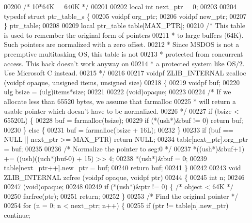 \begin{DoxyCode}
{00200 \textcolor{comment}{/* 10*64K = 640K */}
00201 
00202 local \textcolor{keywordtype}{int} next\_ptr = 0;
00203 
00204 \textcolor{keyword}{typedef} \textcolor{keyword}{struct }ptr\_table\_s \{
00205     voidpf org\_ptr;
00206     voidpf new\_ptr;
00207 \} ptr\_table;
00208 
00209 local ptr\_table table[MAX\_PTR];
00210 \textcolor{comment}{/* This table is used to remember the original form of pointers}
00211 \textcolor{comment}{ * to large buffers (64K). Such pointers are normalized with a zero offset.}
00212 \textcolor{comment}{ * Since MSDOS is not a preemptive multitasking OS, this table is not}
00213 \textcolor{comment}{ * protected from concurrent access. This hack doesn't work anyway on}
00214 \textcolor{comment}{ * a protected system like OS/2. Use Microsoft C instead.}
00215 \textcolor{comment}{ */}
00216 
00217 voidpf ZLIB\_INTERNAL zcalloc (voidpf opaque, \textcolor{keywordtype}{unsigned} items, \textcolor{keywordtype}{unsigned} size)
00218 \{
00219     voidpf buf;
00220     ulg bsize = (ulg)items*size;
00221 
00222     (void)opaque;
00223 
00224     \textcolor{comment}{/* If we allocate less than 65520 bytes, we assume that farmalloc}
00225 \textcolor{comment}{     * will return a usable pointer which doesn't have to be normalized.}
00226 \textcolor{comment}{     */}
00227     \textcolor{keywordflow}{if} (bsize < 65520L) \{
00228         buf = farmalloc(bsize);
00229         \textcolor{keywordflow}{if} (*(ush*)&buf != 0) \textcolor{keywordflow}{return} buf;
00230     \} \textcolor{keywordflow}{else} \{
00231         buf = farmalloc(bsize + 16L);
00232     \}
00233     \textcolor{keywordflow}{if} (buf == NULL || next\_ptr >= MAX\_PTR) \textcolor{keywordflow}{return} NULL;
00234     table[next\_ptr].org\_ptr = buf;
00235 
00236     \textcolor{comment}{/* Normalize the pointer to seg:0 */}
00237     *((ush*)&buf+1) += ((ush)((uch*)buf-0) + 15) >> 4;
00238     *(ush*)&buf = 0;
00239     table[next\_ptr++].new\_ptr = buf;
00240     \textcolor{keywordflow}{return} buf;
00241 \}
00242 
00243 \textcolor{keywordtype}{void} ZLIB\_INTERNAL zcfree (voidpf opaque, voidpf ptr)
00244 \{
00245     \textcolor{keywordtype}{int} n;
00246 
00247     (void)opaque;
00248 
00249     \textcolor{keywordflow}{if} (*(ush*)&ptr != 0) \{ \textcolor{comment}{/* object < 64K */}
00250         farfree(ptr);
00251         \textcolor{keywordflow}{return};
00252     \}
00253     \textcolor{comment}{/* Find the original pointer */}
00254     \textcolor{keywordflow}{for} (n = 0; n < next\_ptr; n++) \{
00255         \textcolor{keywordflow}{if} (ptr != table[n].new\_ptr) \textcolor{keywordflow}{continue};
}
\end{DoxyCode}
